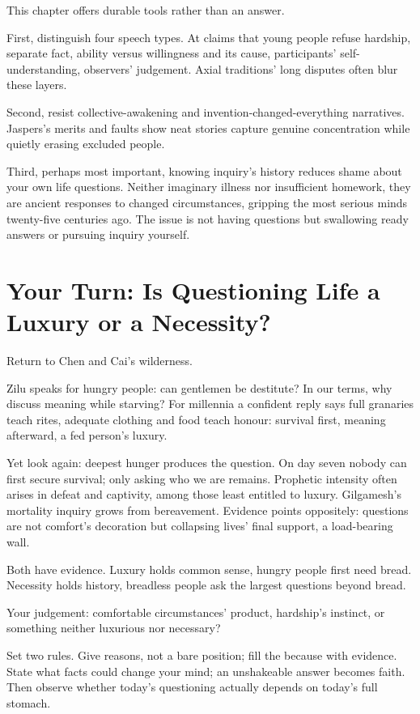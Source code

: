 This chapter offers durable tools rather than an answer.

First, distinguish four speech types. At claims that young people refuse hardship, separate fact, ability versus willingness and its cause, participants' self-understanding, observers' judgement. Axial traditions' long disputes often blur these layers.

Second, resist collective-awakening and invention-changed-everything narratives. Jaspers's merits and faults show neat stories capture genuine concentration while quietly erasing excluded people.

Third, perhaps most important, knowing inquiry's history reduces shame about your own life questions. Neither imaginary illness nor insufficient homework, they are ancient responses to changed circumstances, gripping the most serious minds twenty-five centuries ago. The issue is not having questions but swallowing ready answers or pursuing inquiry yourself.

\section[Your Turn: Luxury or Necessity?]{Your Turn: Is Questioning Life a Luxury or a Necessity?}
Return to Chen and Cai's wilderness.

Zilu speaks for hungry people: can gentlemen be destitute? In our terms, why discuss meaning while starving? For millennia a confident reply says full granaries teach rites, adequate clothing and food teach honour: survival first, meaning afterward, a fed person's luxury.

Yet look again: deepest hunger produces the question. On day seven nobody can first secure survival; only asking who we are remains. Prophetic intensity often arises in defeat and captivity, among those least entitled to luxury. Gilgamesh's mortality inquiry grows from bereavement. Evidence points oppositely: questions are not comfort's decoration but collapsing lives' final support, a load-bearing wall.

Both have evidence. Luxury holds common sense, hungry people first need bread. Necessity holds history, breadless people ask the largest questions beyond bread.

Your judgement: comfortable circumstances' product, hardship's instinct, or something neither luxurious nor necessary?

Set two rules. Give reasons, not a bare position; fill the because with evidence. State what facts could change your mind; an unshakeable answer becomes faith. Then observe whether today's questioning actually depends on today's full stomach.
